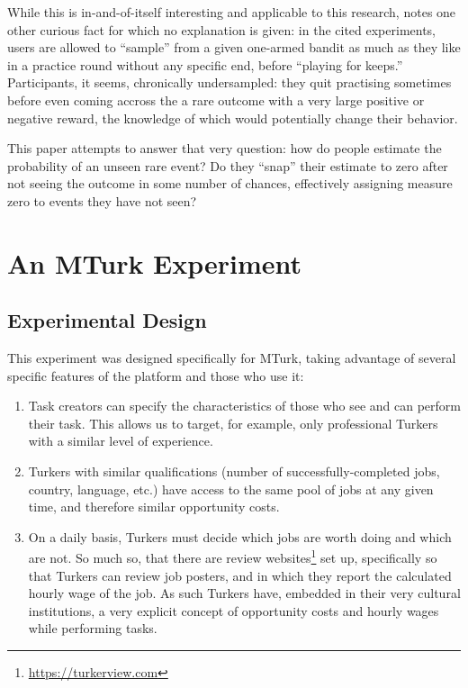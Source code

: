 \documentclass[a4paper,12pt]{article}
\begin{document}
While this is in-and-of-itself interesting and applicable to this research, \cite{hertwig2004} notes one other curious fact for which no explanation is given: in the cited experiments, users are allowed to ``sample'' from a given one-armed bandit as much as they like in a practice round without any specific end, before ``playing for keeps.'' Participants, it seems, chronically undersampled: they quit practising sometimes before even coming accross the a rare outcome with a very large positive or negative reward, the knowledge of which would potentially change their behavior.

This paper attempts to answer that very question: how do people estimate the probability of an unseen rare event? Do they ``snap'' their estimate to zero after not seeing the outcome in some number of chances, effectively assigning measure zero to events they have not seen?


\section{ An MTurk Experiment }

\subsection{ Experimental Design }

This experiment was designed specifically for MTurk, taking advantage of several specific features of the platform and those who use it:

\begin{enumerate}
\item Task creators can specify the characteristics of those who see and can perform their task. This allows us to target, for example, only professional Turkers with a similar level of experience.
\item Turkers with similar qualifications (number of successfully-completed jobs, country, language, etc.) have access to the same pool of jobs at any given time, and therefore similar opportunity costs.
\item On a daily basis, Turkers must decide which jobs are worth doing and which are not. So much so, that there are review websites\footnote{\url{https://turkerview.com}} set up, specifically so that Turkers can review job posters, and in which they report the calculated hourly wage of the job. As such Turkers have, embedded in their very cultural institutions, a very explicit concept of opportunity costs and hourly wages while performing tasks.
\end{enumerate}
\end{document}
